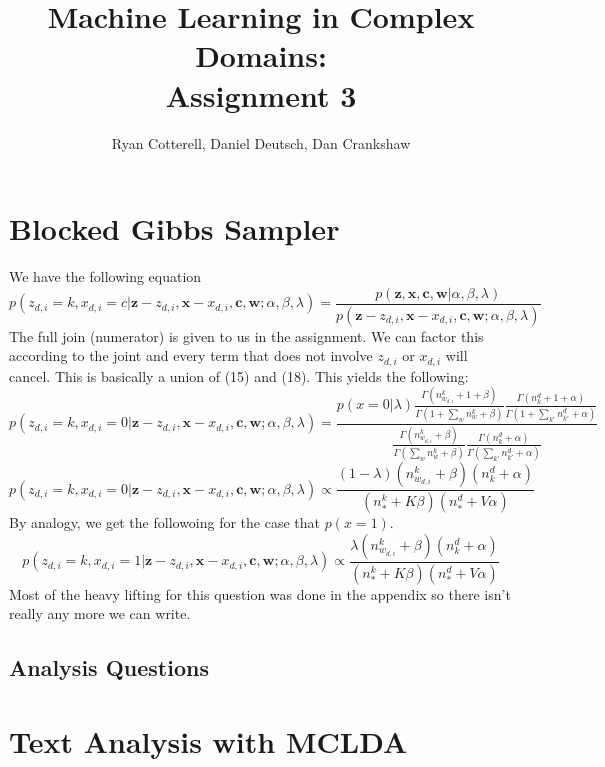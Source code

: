\documentclass[11pt,a4paper]{article}
\title{Machine Learning in Complex Domains:\\Assignment 3}
\author{Ryan Cotterell, Daniel Deutsch, Dan Crankshaw}
\date{}
\begin{document}
	\maketitle
	
	\setcounter{section}{3}
	\section{Blocked Gibbs Sampler}

        We have the following equation
$$
p(z_{d,i} = k,x_{d,i} = c| \mathbf{z} - z_{d,i},\mathbf{x} - x_{d,i}, \mathbf{c},\mathbf{w} ; \alpha,\beta,\lambda) = \frac{p(\mathbf{z},\mathbf{x},\mathbf{c},\mathbf{w}|\alpha,\beta,\lambda)}{p(\mathbf{z} - z_{d,i},\mathbf{x} - x_{d,i},\mathbf{c},\mathbf{w} ; \alpha,\beta,\lambda)}
$$
The full join (numerator) is given to us in the assignment. We can factor this according to the joint and every term that does not involve $z_{d,i}$ or $x_{d,i}$ will cancel. This is basically a union of (15) and (18). This yields the following:
$$
p(z_{d,i} = k, x_{d,i} = 0| \mathbf{z} - z_{d,i},\mathbf{x} - x_{d,i}, \mathbf{c},\mathbf{w} ; \alpha,\beta,\lambda) = \frac{p(x=0|\lambda)
  \frac{\Gamma(n^k_{w_{d,i}} + 1 + \beta)}{\Gamma(1 + \sum_w n_w^k + \beta )} 
    \frac{\Gamma(n_k^d + 1 + \alpha)}{\Gamma(1 + \sum_{k'} n_{k'}^d + \alpha)}
    }
    {
    \frac{\Gamma(n_{w_{d,i}}^k + \beta)}{\Gamma(\sum_w n_w^k + \beta )}
    \frac{\Gamma(n_k^d + \alpha)}{\Gamma(\sum_{k'} n_{k'}^d + \alpha) } 
    }
$$
$$
p(z_{d,i} = k, x_{d,i} = 0| \mathbf{z} - z_{d,i},\mathbf{x} - x_{d,i}, \mathbf{c},\mathbf{w} ; \alpha,\beta,\lambda) \propto \frac{(1-\lambda) (n_{w_{d,i}}^k + \beta) (n_k^d + \alpha)}{(n_*^k + K\beta)(n_*^d + V\alpha)}
$$
By analogy, we get the followoing for the case that $p(x=1)$. 
$$
p(z_{d,i} = k, x_{d,i} = 1| \mathbf{z} - z_{d,i},\mathbf{x} - x_{d,i}, \mathbf{c},\mathbf{w} ; \alpha,\beta,\lambda) \propto \frac{\lambda (n_{w_{d,i}}^k + \beta) (n_k^d + \alpha)}{(n_*^k + K\beta)(n_*^d + V\alpha)}
$$
Most of the heavy lifting for this question was done in the appendix so there isn't really any more we can write. 


	\subsection{Analysis Questions}
	
	\section{Text Analysis with MCLDA}
\end{document}

